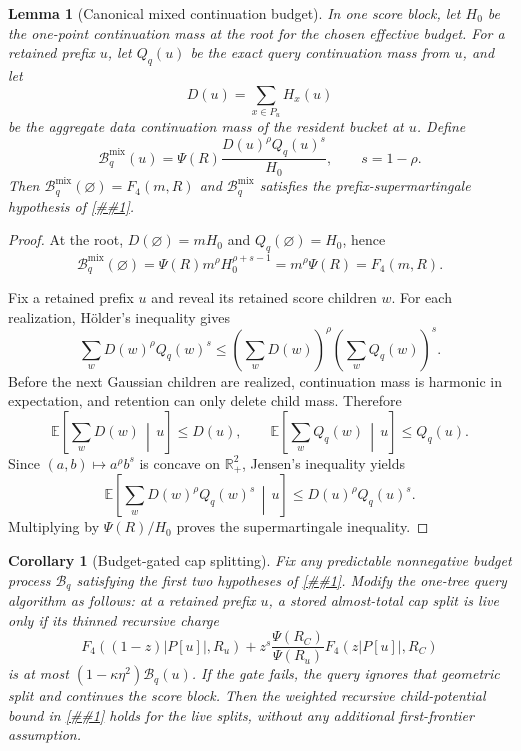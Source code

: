 \documentclass[10pt]{article}
\newcommand{\cref}[1]{\ref{##1}}
\newtheorem{lemma}[theorem]{Lemma}
\newtheorem{corollary}[theorem]{Corollary}
\theoremstyle{definition}
\newcommand{\R}{\mathbb{R}}
\newcommand{\E}{\mathbb{E}}
\begin{document}
\begin{lemma}[Canonical mixed continuation budget]\label{lem:canonical-mixed-budget}
   In one score block, let $H_0$ be the one-point continuation mass at the root for the chosen effective budget. For a retained prefix $u$, let $Q_q(u)$ be the exact query continuation mass from $u$, and let
   \[
      D(u)=\sum_{x\in P_u}H_x(u)
   \]
   be the aggregate data continuation mass of the resident bucket at $u$. Define
   \[
      \mathcal B_q^{\mathrm{mix}}(u)
      =
      \Psi(R)\frac{D(u)^\rho Q_q(u)^s}{H_0},
      \qquad s=1-\rho.
   \]
   Then $\mathcal B_q^{\mathrm{mix}}(\varnothing)=F_4(m,R)$ and $\mathcal B_q^{\mathrm{mix}}$ satisfies the prefix-supermartingale hypothesis of \cref{lem:bellman-frontier-certificate}.
\end{lemma}

\begin{proof}
   At the root, $D(\varnothing)=mH_0$ and $Q_q(\varnothing)=H_0$, hence
   \[
      \mathcal B_q^{\mathrm{mix}}(\varnothing)
      =
      \Psi(R)m^\rho H_0^{\rho+s-1}
      =
      m^\rho\Psi(R)
      =
      F_4(m,R).
   \]

   Fix a retained prefix $u$ and reveal its retained score children $w$. For each realization, Hölder's inequality gives
   \[
      \sum_wD(w)^\rho Q_q(w)^s
      \le
      \left(\sum_wD(w)\right)^\rho
      \left(\sum_wQ_q(w)\right)^s .
   \]
   Before the next Gaussian children are realized, continuation mass is harmonic in expectation, and retention can only delete child mass. Therefore
   \[
      \E\!\left[\sum_wD(w)\,\middle|\,u\right]\le D(u),
      \qquad
      \E\!\left[\sum_wQ_q(w)\,\middle|\,u\right]\le Q_q(u).
   \]
   Since $(a,b)\mapsto a^\rho b^s$ is concave on $\R_+^2$, Jensen's inequality yields
   \[
      \E\left[\sum_wD(w)^\rho Q_q(w)^s\,\middle|\,u\right]
      \le
      D(u)^\rho Q_q(u)^s.
   \]
   Multiplying by $\Psi(R)/H_0$ proves the supermartingale inequality.
\end{proof}

\begin{corollary}[Budget-gated cap splitting]\label{cor:budget-gated-splits}
   Fix any predictable nonnegative budget process $\mathcal B_q$ satisfying the first two hypotheses of \cref{lem:bellman-frontier-certificate}. Modify the one-tree query algorithm as follows: at a retained prefix $u$, a stored almost-total cap split is live only if its thinned recursive charge
   \[
      F_4((1-z)|P[u]|,R_u)
      +
      z^s\frac{\Psi(R_C)}{\Psi(R_u)}F_4(z|P[u]|,R_C)
   \]
   is at most $(1-\kappa\eta^2)\mathcal B_q(u)$. If the gate fails, the query ignores that geometric split and continues the score block. Then the weighted recursive child-potential bound in \cref{asm:mixed-continuation-operator} holds for the live splits, without any additional first-frontier assumption.
\end{corollary}
\end{document}
